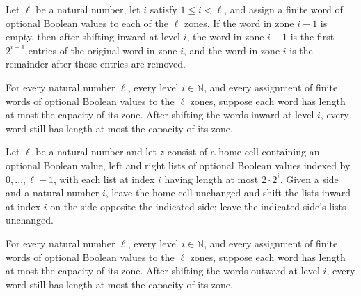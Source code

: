 \begin{theorem}
\label{Turing.zoneShiftInW_full_donor}
\leanok
{}
Let $\ell$ be a natural number, let $i$ satisfy $1\le i<\ell$, and assign a finite word
of optional Boolean values to each of the $\ell$ zones. If the word in zone $i-1$ is
empty, then after shifting inward at level $i$, the word in zone $i-1$ is the first
$2^{i-1}$ entries of the original word in zone $i$, and the word in zone $i$ is the
remainder after those entries are removed.
\end{theorem}

\begin{theorem}
\label{Turing.zoneShiftInW_capacity}
\leanok
{}
For every natural number $\ell$, every level $i\in\mathbb{N}$, and every assignment of
finite words of optional Boolean values to the $\ell$ zones, suppose each word has
length at most the capacity of its zone. After shifting the words inward at level $i$,
every word still has length at most the capacity of its zone.
\end{theorem}

\begin{definition}
\label{Turing.zoneShiftIn}
\leanok
{}
Let $\ell$ be a natural number and let $z$ consist of a home cell containing an optional
Boolean value, left and right lists of optional Boolean values indexed by
$0,\ldots,\ell-1$, with each list at index $i$ having length at most $2\cdot 2^i$. Given
a side and a natural number $i$, leave the home cell unchanged and shift the lists
inward at index $i$ on the side opposite the indicated side; leave the indicated side’s
lists unchanged.
\end{definition}

\begin{theorem}
\label{Turing.zoneShiftOutW_capacity}
\leanok
{}
For every natural number $\ell$, every level $i\in\mathbb{N}$, and every assignment of
finite words of optional Boolean values to the $\ell$ zones, suppose each word has
length at most the capacity of its zone. After shifting the words outward at level $i$,
every word still has length at most the capacity of its zone.
\end{theorem}

